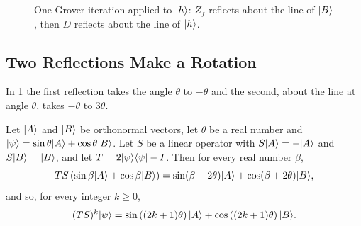 \begin{figure}[ht]
    \centering
    \caption{One Grover iteration applied to $\lvert h \rangle$: $Z_f$ reflects about the line of $\lvert B \rangle$,
        then $D$ reflects about the line of $\lvert h \rangle$.}
    \label{fig:reflections-1008}
\end{figure}

\subsection{Two Reflections Make a Rotation}

In \cref{fig:reflections-1008} the first reflection takes the angle $\theta$ to $-\theta$ and the
second, about the line at angle $\theta$, takes $-\theta$ to $3\theta$.

\begin{claim}\label{lem:tworef-1008}
    Let $\lvert A \rangle$ and $\lvert B \rangle$ be orthonormal vectors, let $\theta$ be a real number and
    $\lvert \psi \rangle = \sin\theta \lvert A \rangle + \cos\theta \lvert B \rangle$. Let $S$ be a linear operator with
    $S\lvert A \rangle = -\lvert A \rangle$ and $S\lvert B \rangle = \lvert B \rangle$, and let $T = 2\lvert \psi \rangle\langle \psi \rvert - I$. Then for
    every real number $\beta$,
    \[T S \left(\sin\beta \lvert A \rangle + \cos\beta \lvert B \rangle\right)
        = \sin(\beta + 2\theta) \lvert A \rangle + \cos(\beta + 2\theta) \lvert B \rangle,\]
    and so, for every integer $k \geq 0$,
    \[(TS)^k \lvert \psi \rangle = \sin\left((2k+1)\theta\right) \lvert A \rangle + \cos\left((2k+1)\theta\right) \lvert B \rangle.\]
\end{claim}

